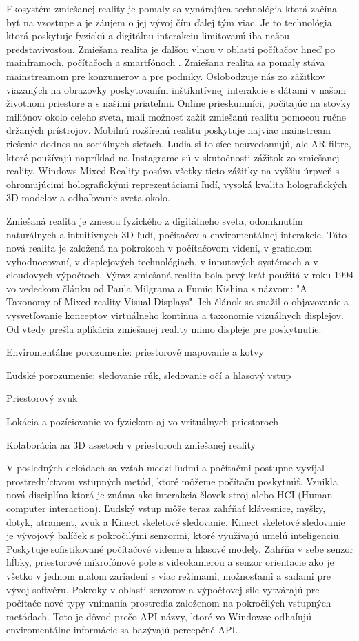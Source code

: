 Ekosystém zmiešanej reality je pomaly sa vynárajúca technológia ktorá začína byť na vzostupe a je záujem o jej vývoj čím ďalej tým viac. Je to technológia ktorá poskytuje fyzickú a digitálnu interakciu limitovanú iba našou predstavivosťou. Zmiešana realita je ďalšou vlnou v oblasti počítačov hneď po mainframoch, počítačoch a smartfónoch . Zmiešana realita sa pomaly stáva mainstreamom pre konzumerov a pre podniky. Oslobodzuje nás zo zážitkov viazaných na obrazovky poskytovaním inštikntívnej interakcie s dátami v našom životnom priestore a s našimi priateľmi. Online prieskumníci, počítajúc na stovky miliónov okolo celeho sveta, mali možnosť zažiť zmiešanú realitu pomocou ručne držaných prístrojov. Mobilnú rozšírenú realitu poskytuje najviac mainstream riešenie dodnes na sociálnych sieťach. Ľudia si to síce neuvedomujú, ale AR filtre, ktoré používajú napríklad na Instagrame sú v skutočnosti zážitok zo zmiešanej reality. Windows Mixed Reality posúva všetky tieto zážitky na vyššiu úrpveň s ohromujúcimi holografickými reprezentáciami ľudí, vysoká kvalita holografických 3D modelov a odhaľovanie sveta okolo.

Zmiešaná realita je zmesou fyzického z digitálneho sveta, odomknutím naturálnych a intuitívnych 3D ľudí, počítačov a enviromentálnej interakcie. Táto nová realita je založená na pokrokoch v počítačovom videní, v grafickom vyhodnocovaní, v displejových technológiach, v inputových systémoch a v cloudovych výpočtoch. Výraz zmiešaná realita bola prvý krát použitá v roku 1994 vo vedeckom článku od Paula Milgrama a Fumio Kishina s názvom: "A Taxonomy of Mixed reality Visual Displays". Ich článok sa snažil o objavovanie a vysvetľovanie konceptov virtuálneho kontinua a taxonomie vizuálnych displejov. Od vtedy prešla aplikácia zmiešanej reality mimo displeje pre poskytnutie:

Enviromentálne porozumenie: priestorové mapovanie a kotvy

Ľudské porozumenie: sledovanie rúk, sledovanie očí a hlasový vstup

Priestorový zvuk

Lokácia a pozíciovanie vo fyzickom aj vo vrituálnych priestoroch

Kolaborácia na 3D assetoch v priestoroch zmiešanej reality

V posledných dekádach sa vzťah medzi ľudmi a počítačmi postupne vyvíjal prostredníctvom vstupných metód, ktoré môžeme počítaču poskytnúť. Vznikla nová disciplína ktorá je známa ako interakcia človek-stroj alebo HCI (Human-computer interaction). Ľudský vstup môže teraz zahŕňať klávesnice, myšky, dotyk, atrament, zvuk a Kinect skeletové sledovanie. 
Kinect skeletové sledovanie je vývojový balíček s pokročilými senzormi, ktoré využívajú umelú inteligenciu. Poskytuje sofistikované počítačové videnie a hlasové modely. Zahŕňa v sebe senzor hĺbky, priestorové mikrofónové pole s videokamerou a senzor orientacie ako je všetko v jednom malom zariadení s viac režimami, možnosťami a sadami pre vývoj softvéru. 
Pokroky v oblasti senzorov a výpočtovej sile vytvárajú pre počítače nové typy vnímania prostredia založenom na pokročilých vstupných metódach. Toto je dôvod prečo API názvy, ktoré vo Windowse odhaľujú enviromentálne informácie sa bazývajú percepčné API.

